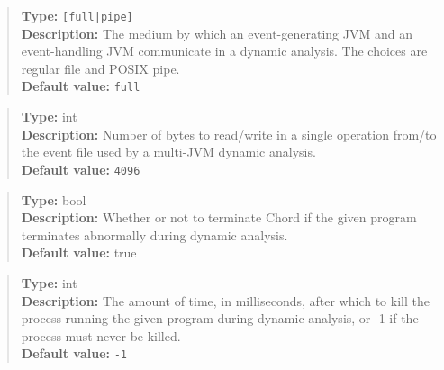 \noindent {}
\begin{quote}
{\bf Type:} {\tt [full|pipe]}  \\
{\bf Description:} The medium by which an event-generating JVM and an event-handling JVM communicate in a dynamic analysis.  The choices are regular file and POSIX pipe.  \\
{\bf Default value:} {\tt full} 
\end{quote}

\noindent {}
\begin{quote}
{\bf Type:} int \\
{\bf Description:} Number of bytes to read/write in a single operation from/to the event file used by a multi-JVM dynamic analysis. \\
{\bf Default value:} {\tt 4096}
\end{quote}

\noindent {}
\begin{quote}
{\bf Type:} bool \\
{\bf Description:} Whether or not to terminate Chord if the given program terminates abnormally during dynamic analysis. \\
{\bf Default value:} true
\end{quote}

\noindent {}
\begin{quote}
{\bf Type:} int  \\
{\bf Description:} The amount of time, in milliseconds, after which to kill the process running the given program during dynamic analysis, or -1 if the process must never be killed. \\
{\bf Default value:} {\tt -1}
\end{quote}

